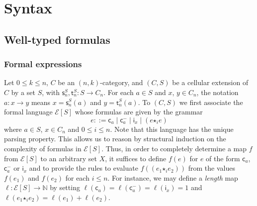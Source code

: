 \documentclass[reqno]{amsart}
\theoremstyle{plain}
\theoremstyle{definition}
\theoremstyle{remark}
\newcommand{\nmbr}[1]{\mathbb #1}
\newcommand{\N}{\nmbr{N}}
\newcommand{\pair}[2]{(#1,#2)}       %
\newcommand{\source}{\mathsf{s}} %
\newcommand{\target}{\mathsf{t}} %
\newcommand{\sce}[1]{\source_{#1}} %
\newcommand{\tge}[1]{\target_{#1}} %
\newcommand{\clx}[2]{\pair{#1}{#2}}%
\newcommand{\expr}[1]{\mathcal{E}[#1]} %
\newcommand{\formal}[1]{\mathsf{#1}} %
\newcommand{\fcst}[1]{\formal{c}_{#1}} %
\newcommand{\finv}[1]{\formal{c}^{\boldsymbol{-}}_{#1}}%
\newcommand{\fid}[1]{\formal{i}_{#1}} %
\newcommand{\fcomp}[1]{\bm{\star}_{#1}} %
\newcommand{\lgh}{\ell}%
\begin{document}
\section{Syntax}\label{sec:syntax}

\subsection{Well-typed formulas}\label{subsec:wtform}

\subsubsection{Formal expressions}\label{ssubsec:formex}
Let $0\leq k\leq n$, $C$ be an $\pair nk$-category, and  $\clx CS$ be a
cellular extension of $C$ by a set $S$, with $\sce n^S,\tge n^S:S\to C_n$. For each $a\in S$ and $x$,
$y\in C_n$, the notation $a:x\to y$ means 
$x=\sce n^S(a)$ and $y=\tge n^S(a)$. To $\clx CS$ we first associate
the formal language $\expr S$ whose formulas are given by the grammar
\[
  e ::= \fcst{a} \mid \finv{a} \mid \fid{x} \mid (e\fcomp i e)
\]
where $a\in S$, $x\in C_n$ and $0\leq i\leq n$. Note that this
language has the unique parsing property. This allows us to reason by
structural induction on the complexity of formulas in $\expr S$. Thus,
in order to completely determine a map $f$ from $\expr S$ to an arbitrary
set $X$, it suffices to define $f(e)$ for $e$ of the form $\fcst a$,
$\finv a$ or $\fid x$ and to provide the rules to evaluate $f((e_1\fcomp
i e_2))$ from the values $f(e_1)$ and $f(e_2)$ for each $i\leq n$.
For instance, we may define a {\em length} map $\lgh:\expr S\to \N$
by setting $\lgh(\fcst a)=\lgh(\finv a)= \lgh(\fid x)=1$ and $\lgh
(e_1\fcomp i e_2)=\lgh(e_1)+\lgh(e_2)$. 
\end{document}
